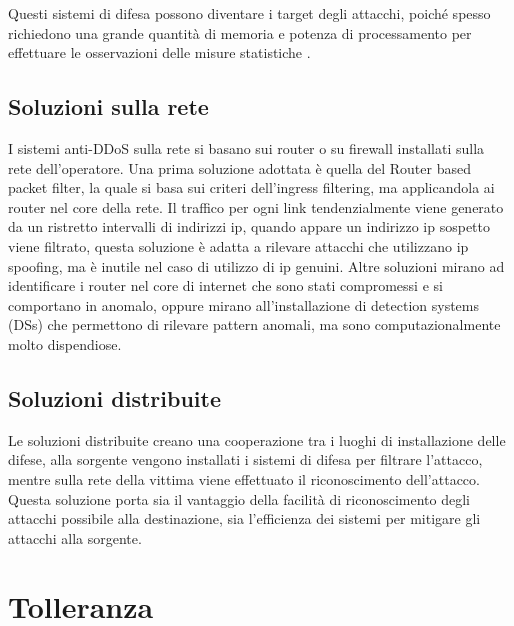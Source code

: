 Questi sistemi di difesa possono diventare i target degli attacchi, poiché spesso richiedono una grande quantità di memoria e potenza di processamento per effettuare le osservazioni delle misure statistiche \cite{ddos_survey_4}.

\subsection{Soluzioni sulla rete}

I sistemi anti-DDoS sulla rete si basano sui router o su firewall installati sulla rete dell'operatore.
Una prima soluzione adottata è quella del Router based packet filter, la quale si basa sui criteri dell'ingress filtering, ma applicandola ai router nel core della rete. Il traffico per ogni link tendenzialmente viene generato da un ristretto intervalli di indirizzi ip, quando appare un indirizzo ip sospetto viene filtrato, questa soluzione è adatta a rilevare attacchi che utilizzano ip spoofing, ma è inutile nel caso di utilizzo di ip genuini.
Altre soluzioni mirano ad identificare i router nel core di internet che sono stati compromessi e si comportano in anomalo, oppure mirano all'installazione di detection systems (DSs) che permettono di rilevare pattern anomali, ma sono computazionalmente molto dispendiose.

\subsection{Soluzioni distribuite}

Le soluzioni distribuite creano una cooperazione tra i luoghi di installazione delle difese, alla sorgente vengono installati i sistemi di difesa per filtrare l'attacco, mentre sulla rete della vittima viene effettuato il riconoscimento dell'attacco. Questa soluzione porta sia il vantaggio della facilità di riconoscimento degli attacchi possibile alla destinazione, sia l'efficienza dei sistemi per mitigare gli attacchi alla sorgente.


\section{Tolleranza}
